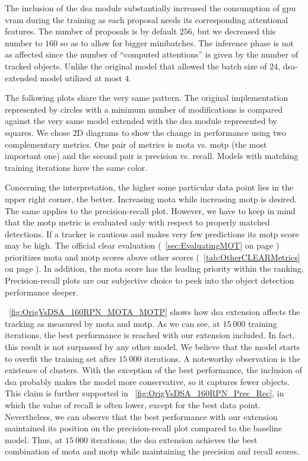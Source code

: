 The inclusion of the \gls{dsa} module substantially increased the consumption of \gls{gpu} \gls{vram} during the training as each proposal needs its corresponding attentional features. The number of proposals is by default $256$, but we decreased this number to $160$ so as to allow for bigger minibatches. The inference phase is not as affected since the number of ``computed attentions'' is given by the number of tracked objects. Unlike the original model that allowed the batch size of $24$, \gls{dsa}-extended model utilized at most $4$.

The following plots share the very same pattern. The original implementation represented by circles with a minimum number of modifications is compared against the very same model extended with the \gls{dsa} module represented by squares. We chose $2$D diagrams to show the change in performance using two complementary metrics. One pair of metrics is \gls{mota} vs. \gls{motp} (the most important one) and the second pair is precision vs. recall. Models with matching training iterations have the same color.

Concerning the interpretation, the higher some particular data point lies in the upper right corner, the better. Increasing \gls{mota} while increasing \gls{motp} is desired. The same applies to the precision-recall plot. However, we have to keep in mind that the \gls{motp} metric is evaluated only with respect to properly matched detections. If a tracker is cautious and makes very few predictions its \gls{motp} score may be high. The official \gls{clear} evaluation (\sectiontext{}~\ref{sec:EvaluatingMOT} on page \pageref{sec:EvaluatingMOT}) prioritizes \gls{mota} and \gls{motp} scores above other scores (\tabletext{}~\ref{tab:OtherCLEARMetrics} on page \pageref{tab:OtherCLEARMetrics}). In addition, the \gls{mota} score has the leading priority within the ranking. Precision-recall plots are our subjective choice to peek into the object detection performance deeper.

\figtext{}~\ref{fig:OrigVsDSA_160RPN_MOTA_MOTP} shows how \gls{dsa} extension affects the tracking as measured by \gls{mota} and \gls{motp}. As we can see, at $15\ 000$ training iterations, the best performance is reached with our extension included. In fact, this result is not surpassed by any other model. We believe that the model starts to overfit the training set after $15\ 000$ iterations. A noteworthy observation is the existence of clusters. With the exception of the best performance, the inclusion of \gls{dsa} probably makes the model more conservative, so it captures fewer objects. This claim is further supported in \figtext{}~\ref{fig:OrigVsDSA_160RPN_Prec_Rec}, in which the value of recall is often lower, except for the best data point. Nevertheless, we can observe that the best performance with our extension maintained its position on the precision-recall plot compared to the baseline model. Thus, at $15\ 000$ iterations, the \gls{dsa} extension achieves the best combination of \gls{mota} and \gls{motp} while maintaining the precision and recall scores.

